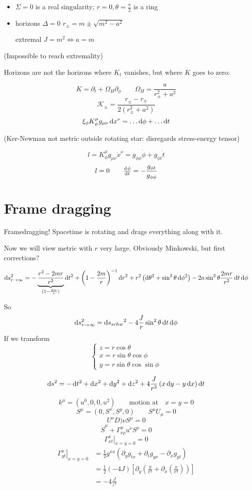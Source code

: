 \begin{itemize}
\item $\Sigma = 0$ is a real singularity; $r=0, \theta = \frac{\pi}{2}$ is a ring
\item horizons $\Delta = 0$ $r_\pm = m \pm \sqrt{m^2 - a^2}$

extremal $J = m^2 \Leftrightarrow a = m$
\end{itemize}
(Impossible to reach extremality)

Horizons are not the horizons where $K_t$ vanishes, but where $K$ goes to zero:

\[ K = \partial_t + \Omega_H \partial_\phi \qquad \Omega_H = \frac{a}{r_\pm^2 + a^2} \]
\[ \mathcal{K}_\pm = \frac{r_\pm - r_\mp}{2(r_\pm^2 + a^2)} \]
\[ \xi_\phi K^\mu_\phi g_{\mu\nu} \operatorname{d \!}{x^\nu} = \ldots \operatorname{d \!}{\phi} + \ldots \operatorname{d \!}{t}  \]

(Ker-Newman not metric outside rotating star: disregards stress-energy tensor)

\[ l = K_\phi^\mu g_{\mu\nu} \dot{x}^\nu = g_{\phi\phi} \dot{\phi} + g_{\phi t}\dot{t}\]
\[ l = 0 \qquad \od{\phi}{t} = - \frac{g_{\phi t}}{g_{\phi\phi}} \]
\section{Frame dragging}
Framedragging! Spacetime is rotating and drags everything along with it.

Now we will view metric with $r$ very large. Obviously Minkowski, but first corrections?

\[ \operatorname{d \!}{s}^2_{r \to \infty} = - \underbrace{\frac{r^2 - 2mr}{r^2}}_{(1- \frac{2m}{r})}\operatorname{d \!}{t}^2 + \left(1 - \frac{2m}{r}\right)^{-1} \operatorname{d \!}{r}^2 + r^2 \left(\operatorname{d \!}{\theta}^2 + \sin^2\theta \operatorname{d \!}{\phi}^2\right) - 2a \sin^2\theta \frac{2mr}{r^2} \operatorname{d \!}{t}\operatorname{d \!}{\phi} \]

So
\[ \operatorname{d \!}{s}^2_{r \to \infty} = \operatorname{d \!}{s_{schw}}^2 - 4 \frac{J}{r}\sin^2\theta \operatorname{d \!}{t}\operatorname{d \!}{\phi} \]
If we transform
\[ \begin{cases}
z = r\cos\theta \\
x = r \sin\theta \cos\phi \\
y = r \sin\theta \cos\sin\phi
\end{cases} \]

\[ \diff{s}^2 = - \diff{t}^2 + \diff{x}^2 + \diff{y}^2 + \diff{z}^2 + 4 \frac{J}{r^3}\left(x \diff{y} - y \diff{x}\right)\diff{t} \]

\[ k^\mu = (u^0, 0,0, u^2) \qquad \text{motion at} \quad x=y=0 \]
\[ S^\mu = (0,S^x,S^y,0) \qquad S^\mu U_\mu = 0 \]
\[ U^\nu D)\nu S^\mu = 0 \]
\[ \dot{S}^\mu + \Gamma^\mu_{\nu\rho} u^\nu S^\rho = 0\]
\[ \left.\Gamma^x_{xt}\right|_{x=y=0} = 0\]
\begin{align*}
\left.\Gamma^x_{yt} \right|_{x=y=0} &= \frac{1}{2}g^{xx} \left(\partial_y g_{tx} + \partial_t g_{yx} - \partial_x g_{yt}\right) \\
&= \frac{1}{2}(-4J)\left[\partial_y \left(\frac{y}{r^3}+ \partial_x \left(\frac{x}{r^3}\right)\right)\right] \\
&= -4 \frac{J}{z^3}
\end{align*}

